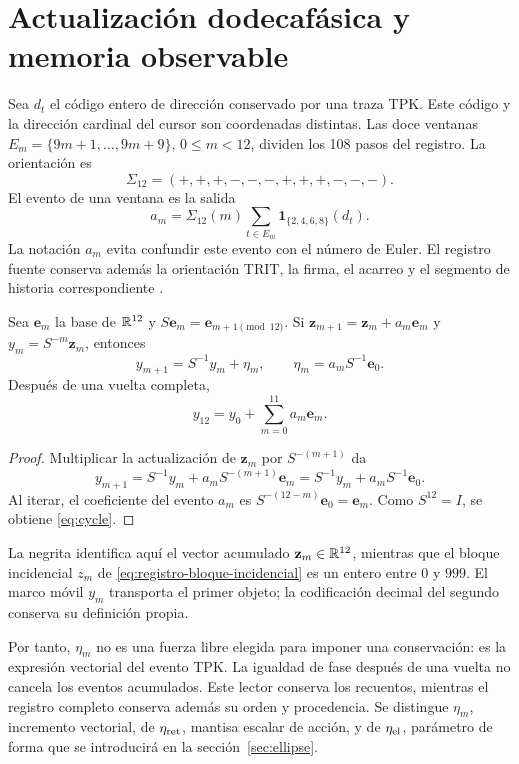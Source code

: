 \section{Actualización dodecafásica y memoria observable}
\label{sec:eta}
Sea $d_t$ el código entero de dirección conservado por una traza TPK.
Este código y la dirección cardinal del cursor son coordenadas distintas.
Las doce ventanas
$E_m=\{9m+1,\ldots,9m+9\}$, $0\le m<12$, dividen los 108 pasos del registro.
La orientación es
\[
\Sigma_{12}=(+,+,+,-,-,-,+,+,+,-,-,-).
\]
El evento de una ventana es la salida
\begin{equation}
a_m=\Sigma_{12}(m)
\sum_{t\in E_m}\mathbf1_{\{2,4,6,8\}}(d_t).
\label{eq:events}
\end{equation}
La notación $a_m$ evita confundir este evento con el número de Euler.
El registro fuente conserva además la orientación TRIT, la firma,
el acarreo y el segmento de historia correspondiente \cite{registro}.

\begin{proposition}
Sea $\mathbf e_m$ la base de $\mathbb R^{12}$ y
$S\mathbf e_m=\mathbf e_{m+1\pmod{12}}$. Si
$\mathbf z_{m+1}=\mathbf z_m+a_m\mathbf e_m$ y $y_m=S^{-m}\mathbf z_m$, entonces
\begin{equation}
y_{m+1}=S^{-1}y_m+\eta_m,
\qquad
\eta_m=a_mS^{-1}\mathbf e_0.
\label{eq:eta}
\end{equation}
Después de una vuelta completa,
\begin{equation}
y_{12}=y_0+\sum_{m=0}^{11}a_m\mathbf e_m.
\label{eq:cycle}
\end{equation}
\end{proposition}
\begin{proof}
Multiplicar la actualización de $\mathbf z_m$ por $S^{-(m+1)}$ da
\[
y_{m+1}=S^{-1}y_m+a_mS^{-(m+1)}\mathbf e_m
=S^{-1}y_m+a_mS^{-1}\mathbf e_0.
\]
Al iterar, el coeficiente del evento $a_m$ es
$S^{-(12-m)}\mathbf e_0=\mathbf e_m$. Como $S^{12}=I$,
se obtiene \eqref{eq:cycle}.
\end{proof}

La negrita identifica aquí el vector acumulado
\(\mathbf z_m\in\mathbb R^{12}\), mientras que el bloque incidencial
\(z_m\) de \eqref{eq:registro-bloque-incidencial} es un entero entre
\(0\) y \(999\). El marco móvil \(y_m\) transporta el primer objeto;
la codificación decimal del segundo conserva su definición propia.

Por tanto, $\eta_m$ no es una fuerza libre elegida para imponer una
conservación: es la expresión vectorial del evento TPK. La igualdad de fase
después de una vuelta no cancela los eventos acumulados. Este lector
conserva los recuentos, mientras el registro completo conserva además su
orden y procedencia. Se distingue $\eta_m$, incremento vectorial, de
$\eta_{\rm ret}$, mantisa escalar de acción, y de $\eta_{\rm el}$,
parámetro de forma que se introducirá en la sección~\ref{sec:ellipse}.

